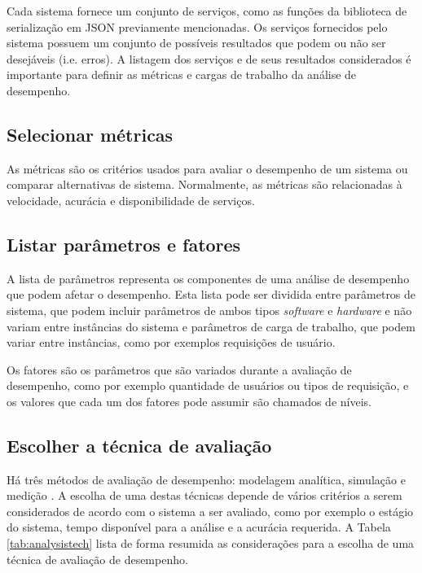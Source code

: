 Cada sistema fornece um conjunto de serviços, como as funções da biblioteca de serialização em JSON previamente mencionadas. Os serviços fornecidos pelo sistema possuem um conjunto de possíveis resultados que podem ou não ser desejáveis (i.e. erros). A listagem dos serviços e de seus resultados considerados é importante para definir as métricas e cargas de trabalho da análise de desempenho.

\subsection{Selecionar métricas}

As métricas são os critérios usados para avaliar o desempenho de um sistema ou comparar alternativas de sistema. Normalmente, as métricas são relacionadas à velocidade, acurácia e disponibilidade de serviços.

\subsection{Listar parâmetros e fatores}

A lista de parâmetros representa os componentes de uma análise de desempenho que podem afetar o desempenho. Esta lista pode ser dividida entre parâmetros de sistema, que podem incluir parâmetros de ambos tipos \textit{software} e \textit{hardware} e não variam entre instâncias do sistema e parâmetros de carga de trabalho, que podem variar entre instâncias, como por exemplos requisições de usuário.

Os fatores são os parâmetros que são variados durante a avaliação de desempenho, como por exemplo quantidade de usuários ou tipos de requisição, e os valores que cada um dos fatores pode assumir são chamados de níveis.

\subsection{Escolher a técnica de avaliação}

Há três métodos de avaliação de desempenho: modelagem analítica, simulação e medição \cite{jain1991art}. A escolha de uma destas técnicas depende de vários critérios a serem considerados de acordo com o sistema a ser avaliado, como por exemplo o estágio do sistema, tempo disponível para a análise e a acurácia requerida. A Tabela \ref{tab:analysistech} lista de forma resumida as considerações para a escolha de uma técnica de avaliação de desempenho.

